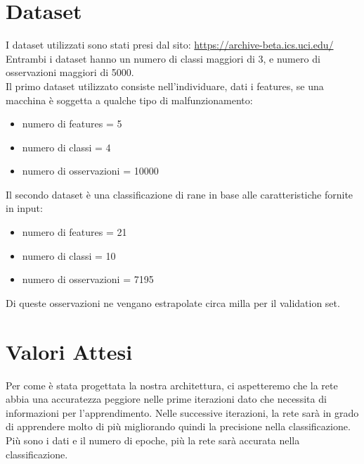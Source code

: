 \documentclass{article}
\begin{document}
    \section{Dataset}\label{sec:dataset}
        I dataset utilizzati sono stati presi dal sito: \href{https://archive-beta.ics.uci.edu/}{https://archive-beta.ics.uci.edu/} \\
        Entrambi i dataset hanno un numero di classi maggiori di 3, e numero di osservazioni maggiori di 5000. \\
        Il primo dataset utilizzato consiste nell'individuare, dati i features, se una macchina è soggetta a qualche tipo di malfunzionamento:
        \begin{itemize}
            \item numero di features = 5
            \item numero di classi = 4
            \item numero di osservazioni = 10000
        \end{itemize}
        Il secondo dataset è una classificazione di rane in base alle caratteristiche fornite in input:
        \begin{itemize}
            \item numero di features = 21
            \item numero di classi = 10
            \item numero di osservazioni = 7195
        \end{itemize}
        Di queste osservazioni ne vengano estrapolate circa milla per il validation set.
    \section{Valori Attesi}\label{sec:valori-attesi}
        Per come è stata progettata la nostra architettura, ci aspetteremo che la rete abbia una accuratezza peggiore nelle prime iterazioni dato che necessita di informazioni per l'apprendimento.
        Nelle successive iterazioni, la rete sarà in grado di apprendere molto di più migliorando quindi la precisione nella classificazione.
        Più sono i dati e il numero di epoche, più la rete sarà accurata nella classificazione.
\end{document}
